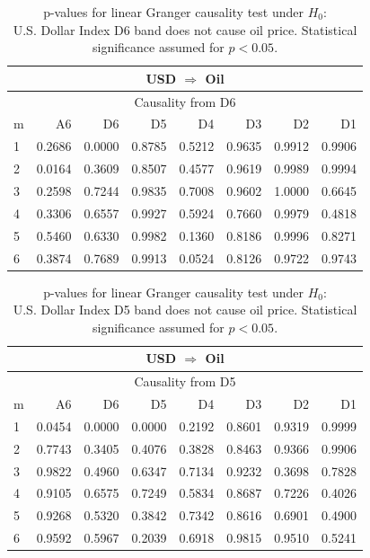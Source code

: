 %
%
\begin{table}[H]
\begin{center}
\begin{tabular}{l|r r r r r r r}
\hline\hline
\multicolumn{8}{c}{USD $\Rightarrow$ Oil}\\
\hline
\multicolumn{8}{c}{Causality from D6}\\
\hline\hline
m & A6 & D6 & D5 & D4 & D3 & D2 & D1 \\
\hline
1 & 0.2686 & \cellcolor{mygrey}0.0000 & 0.8785 & 0.5212 & 0.9635 & 0.9912 & 0.9906 \\
2 & \cellcolor{mygrey}0.0164 & 0.3609 & 0.8507 & 0.4577 & 0.9619 & 0.9989 & 0.9994 \\
3 & 0.2598 & 0.7244 & 0.9835 & 0.7008 & 0.9602 & 1.0000 & 0.6645 \\
4 & 0.3306 & 0.6557 & 0.9927 & 0.5924 & 0.7660 & 0.9979 & 0.4818 \\
5 & 0.5460 & 0.6330 & 0.9982 & 0.1360 & 0.8186 & 0.9996 & 0.8271 \\
6 & 0.3874 & 0.7689 & 0.9913 & 0.0524 & 0.8126 & 0.9722 & 0.9743 \\
\hline\hline
\end{tabular}
\caption{p-values for linear Granger causality test under $H_0$:\\
U.S. Dollar Index D6 band does not cause oil price. Statistical significance assumed for $p<0.05$.}
\end{center}
\end{table}

%
%
\begin{table}[H]
\begin{center}
\begin{tabular}{l|r r r r r r r}
\hline\hline
\multicolumn{8}{c}{USD $\Rightarrow$ Oil}\\
\hline
\multicolumn{8}{c}{Causality from D5}\\
\hline\hline
m & A6 & D6 & D5 & D4 & D3 & D2 & D1 \\
\hline
1 & \cellcolor{mygrey}0.0454 & \cellcolor{mygrey}0.0000 & \cellcolor{mygrey}0.0000 & 0.2192 & 0.8601 & 0.9319 & 0.9999 \\
2 & 0.7743 & 0.3405 & 0.4076 & 0.3828 & 0.8463 & 0.9366 & 0.9906 \\
3 & 0.9822 & 0.4960 & 0.6347 & 0.7134 & 0.9232 & 0.3698 & 0.7828 \\
4 & 0.9105 & 0.6575 & 0.7249 & 0.5834 & 0.8687 & 0.7226 & 0.4026 \\
5 & 0.9268 & 0.5320 & 0.3842 & 0.7342 & 0.8616 & 0.6901 & 0.4900 \\
6 & 0.9592 & 0.5967 & 0.2039 & 0.6918 & 0.9815 & 0.9510 & 0.5241 \\
\hline\hline
\end{tabular}
\caption{p-values for linear Granger causality test under $H_0$:\\
U.S. Dollar Index D5 band does not cause oil price. Statistical significance assumed for $p<0.05$.}
\end{center}
\end{table}


